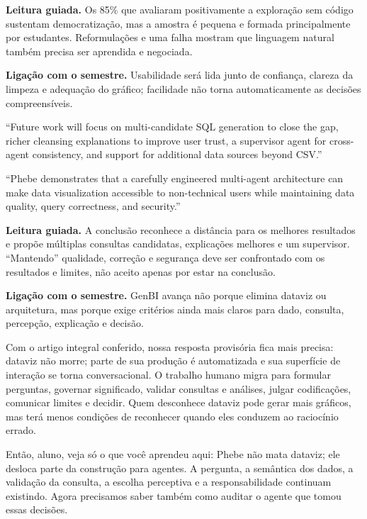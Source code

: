 \noindent\textbf{Leitura guiada.} Os 85\% que avaliaram positivamente a exploração sem código sustentam democratização, mas a amostra é pequena e formada principalmente por estudantes. Reformulações e uma falha mostram que linguagem natural também precisa ser aprendida e negociada.

\noindent\textbf{Ligação com o semestre.} Usabilidade será lida junto de confiança, clareza da limpeza e adequação do gráfico; facilidade não torna automaticamente as decisões compreensíveis.

\begin{ArticleBox}
``Future work will focus on multi-candidate SQL generation to close the gap, richer cleansing explanations to improve user trust, a supervisor agent for cross-agent consistency, and support for additional data sources beyond CSV.''

``Phebe demonstrates that a carefully engineered multi-agent architecture can make data visualization accessible to non-technical users while maintaining data quality, query correctness, and security.''
\end{ArticleBox}

\noindent\textbf{Leitura guiada.} A conclusão reconhece a distância para os melhores resultados e propõe múltiplas consultas candidatas, explicações melhores e um supervisor. ``Mantendo'' qualidade, correção e segurança deve ser confrontado com os resultados e limites, não aceito apenas por estar na conclusão.

\noindent\textbf{Ligação com o semestre.} GenBI avança não porque elimina dataviz ou arquitetura, mas porque exige critérios ainda mais claros para dado, consulta, percepção, explicação e decisão.

Com o artigo integral conferido, nossa resposta provisória fica mais precisa: dataviz não morre; parte de sua produção é automatizada e sua superfície de interação se torna conversacional. O trabalho humano migra para formular perguntas, governar significado, validar consultas e análises, julgar codificações, comunicar limites e decidir. Quem desconhece dataviz pode gerar mais gráficos, mas terá menos condições de reconhecer quando eles conduzem ao raciocínio errado.

\begin{SummaryBox}
Então, aluno, veja só o que você aprendeu aqui: Phebe não mata dataviz; ele desloca parte da construção para agentes. A pergunta, a semântica dos dados, a validação da consulta, a escolha perceptiva e a responsabilidade continuam existindo. Agora precisamos saber também como auditar o agente que tomou essas decisões.
\end{SummaryBox}


